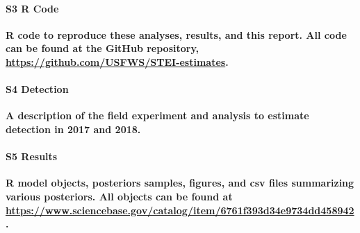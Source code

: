 \documentclass[
  10pt,
  letterpaper,
]{article}
\begin{document}
\paragraph*{S3 R Code}
\label{s3-code}
{\textbf{R code to reproduce these analyses, results, and this report.
All code can be found at the GitHub repository,
\url{https://github.com/USFWS/STEI-estimates}.}}

\paragraph*{S4 Detection}
\label{s4-bradley}
{\textbf{A description of the field experiment and analysis to estimate
detection in 2017 and 2018.}}

\paragraph*{S5 Results}
\label{s5-results}
{\textbf{R model objects, posteriors samples, figures, and csv files
summarizing various posteriors. All objects can be found at
\url{https://www.sciencebase.gov/catalog/item/6761f393d34e9734dd458942}.}}


\nolinenumbers
\end{document}
